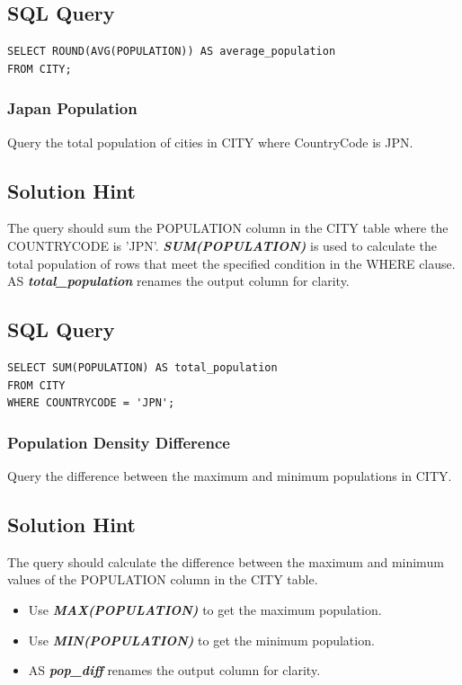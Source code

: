 \documentclass[12pt,a4paper]{article}
\begin{document}
\subsection*{SQL Query}
\begin{lstlisting}[style=sqlstyle]
SELECT ROUND(AVG(POPULATION)) AS average_population
FROM CITY;
\end{lstlisting}
\subsubsection{Japan Population}
Query the total population of cities in CITY where CountryCode is JPN.
\subsection*{Solution Hint}
The query should sum the POPULATION column in the CITY table where the COUNTRYCODE is 'JPN'.
\newline
\textit{\textbf{SUM(POPULATION)}} is used to calculate the total population
of rows that meet the specified condition in the WHERE clause.
AS \textit{\textbf{total\_population}} renames the output column for clarity.
\subsection*{SQL Query}
\begin{lstlisting}[style=sqlstyle]
SELECT SUM(POPULATION) AS total_population
FROM CITY
WHERE COUNTRYCODE = 'JPN';
\end{lstlisting}
\subsubsection{Population Density Difference}
Query the difference between the maximum and minimum populations in CITY.
\subsection*{Solution Hint}
The query should calculate the difference between the maximum and minimum values of the POPULATION column in the
CITY table.
\begin{itemize}
    \item Use \textit{\textbf{MAX(POPULATION)}} to get the maximum population.
    \item Use \textit{\textbf{MIN(POPULATION)}} to get the minimum population.
    \item AS \textit{\textbf{pop\_diff}} renames the output column for clarity.
\end{itemize}
\end{document}
